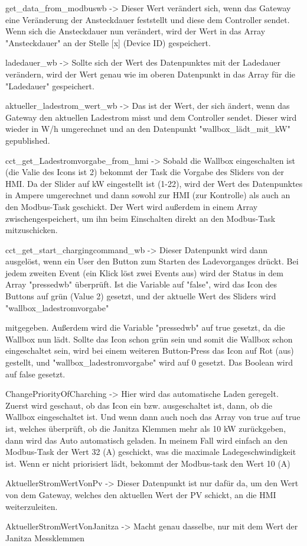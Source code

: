\begin{compactitem}
  \item get\_data\_from\_modbuswb -> Dieser Wert verändert sich, wenn das Gateway eine Veränderung der Ansteckdauer feststellt und diese dem Controller sendet. Wenn sich die Ansteckdauer nun verändert, wird der Wert in das Array "Ansteckdauer" an der Stelle [x] (Device ID) gespeichert.   
  \item ladedauer\_wb -> Sollte sich der Wert des Datenpunktes mit der Ladedauer verändern, wird der Wert genau wie im oberen Datenpunkt in das Array für die "Ladedauer" gespeichert.  
  \item aktueller\_ladestrom\_wert\_wb -> Das ist der Wert, der sich ändert, wenn das Gateway den aktuellen Ladestrom misst und dem Controller sendet. Dieser wird wieder in W/h umgerechnet und an den Datenpunkt "wallbox\_lädt\_mit\_kW" gepublished.  
  \item cct\_get\_Ladestromvorgabe\_from\_hmi -> Sobald die Wallbox eingeschalten ist (die Valie des Icons ist 2) bekommt der Task die Vorgabe des Sliders von der HMI. Da der Slider auf kW eingestellt ist (1-22), wird der Wert des Datenpunktes in Ampere umgerechnet und dann sowohl zur HMI (zur Kontrolle) als auch an den Modbus-Task geschickt. Der Wert wird außerdem in einem Array zwischengespeichert, um ihn beim Einschalten direkt an den Modbus-Task mitzuschicken.  
  \item cct\_get\_start\_chargingcommand\_wb -> Dieser Datenpunkt wird dann ausgelöst, wenn ein User den Button zum Starten des Ladevorganges drückt. Bei jedem zweiten Event (ein Klick löst zwei Events aus) wird der Status in dem Array "pressedwb" überprüft. Ist die Variable auf "false", wird das Icon des Buttons auf grün (Value 2) gesetzt, und der aktuelle Wert des Sliders wird "wallbox\_ladestromvorgabe"  
  \item 
  mitgegeben. Außerdem wird die Variable "pressedwb" auf true gesetzt, da die Wallbox nun lädt. Sollte das Icon schon grün sein und somit die Wallbox schon eingeschaltet sein, wird bei einem weiteren Button-Press das Icon auf Rot (aus) gestellt, und "wallbox\_ladestromvorgabe" wird auf 0 gesetzt. Das Boolean wird auf false gesetzt. 
  \item ChangePriorityOfCharching -> Hier wird das automatische Laden geregelt. Zuerst wird geschaut, ob das Icon ein bzw. ausgeschaltet ist, dann, ob die Wallbox eingeschaltet ist. Und wenn dann auch noch das Array von true auf true ist, welches überprüft, ob die Janitza Klemmen mehr als 10 kW zurückgeben, dann wird das Auto automatisch geladen. In meinem Fall wird einfach an den Modbus-Task der Wert 32 (A) geschickt, was die maximale Ladegeschwindigkeit ist. Wenn er nicht priorisiert lädt, bekommt der Modbus-task den Wert 10 (A)  
  \item AktuellerStromWertVonPv -> Dieser Datenpunkt ist nur dafür da, um den Wert von dem Gateway, welches den aktuellen Wert der PV schickt, an die HMI weiterzuleiten. 
  \item AktuellerStromWertVonJanitza -> Macht genau dasselbe, nur mit dem Wert der Janitza Messklemmen  
\end{compactitem}

